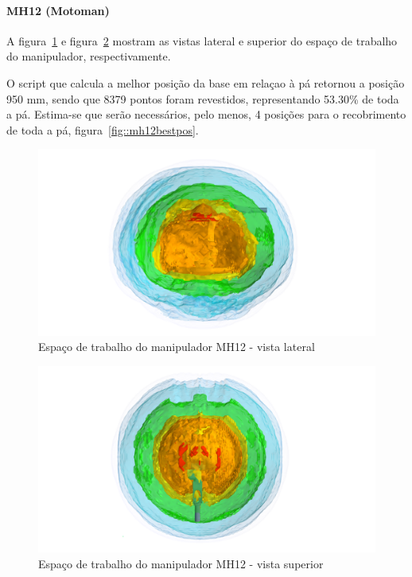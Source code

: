 \paragraph{MH12 (Motoman)}
A figura~\ref{fig::mh12cin1} e figura~\ref{fig::mh12cin2} mostram as vistas
lateral e superior do espaço de trabalho do manipulador, respectivamente.

O script que calcula a melhor posição da base em relaçao à pá retornou a posição
950 mm, sendo que 8379 pontos foram revestidos, representando 53.30\% de toda a
pá. Estima-se que serão necessários, pelo menos, 4 posições para o recobrimento
de toda a pá, figura~\ref{fig::mh12bestpos}.

\begin{figure}[h!]	
	\includegraphics[width=\columnwidth]{detail/figs/bighatch/mh12_front.png}
	\caption{Espaço de trabalho do manipulador MH12 - vista lateral}
	\label{fig::mh12cin1}
\end{figure}

\begin{figure}[h!]	
	\includegraphics[width=\columnwidth]{detail/figs/bighatch/mh12_top.png}
	\caption{Espaço de trabalho do manipulador MH12 - vista superior}
	\label{fig::mh12cin2}
\end{figure}

